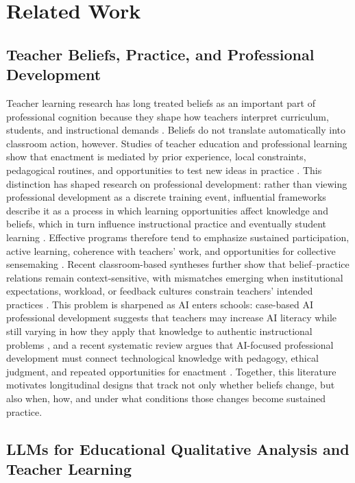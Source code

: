 \documentclass[pdflatex,sn-mathphys-num]{sn-jnl}%
\theoremstyle{thmstyleone}%
\theoremstyle{thmstyletwo}%
\theoremstyle{thmstylethree}%
\begin{document}
\section{Related Work}

\subsection{Teacher Beliefs, Practice, and Professional Development}

Teacher learning research has long treated beliefs as an important part of professional cognition because they shape how teachers interpret curriculum, students, and instructional demands \cite{borg2003cognition,fives2012beliefs}. Beliefs do not translate automatically into classroom action, however. Studies of teacher education and professional learning show that enactment is mediated by prior experience, local constraints, pedagogical routines, and opportunities to test new ideas in practice \cite{korthagen2010difference,avalos2011pd}. This distinction has shaped research on professional development: rather than viewing professional development as a discrete training event, influential frameworks describe it as a process in which learning opportunities affect knowledge and beliefs, which in turn influence instructional practice and eventually student learning \cite{desimone2009impact,kennedy2016pd}. Effective programs therefore tend to emphasize sustained participation, active learning, coherence with teachers' work, and opportunities for collective sensemaking \cite{darlinghammond2017effective}. Recent classroom-based syntheses further show that belief--practice relations remain context-sensitive, with mismatches emerging when institutional expectations, workload, or feedback cultures constrain teachers' intended practices \cite{mao2024wcf}. This problem is sharpened as AI enters schools: case-based AI professional development suggests that teachers may increase AI literacy while still varying in how they apply that knowledge to authentic instructional problems \cite{ding2024ailiteracy}, and a recent systematic review argues that AI-focused professional development must connect technological knowledge with pedagogy, ethical judgment, and repeated opportunities for enactment \cite{dogan2025aipd}. Together, this literature motivates longitudinal designs that track not only whether beliefs change, but also when, how, and under what conditions those changes become sustained practice.

\subsection{LLMs for Educational Qualitative Analysis and Teacher Learning}
\end{document}

